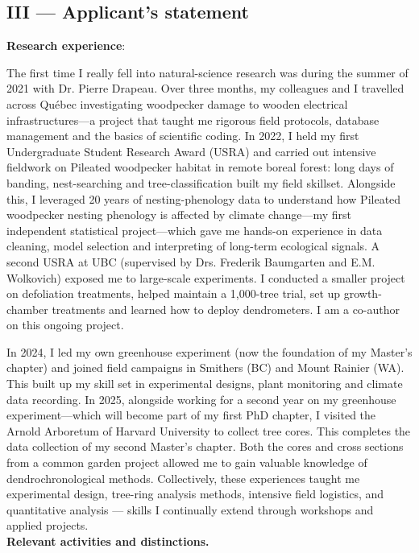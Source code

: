 \documentclass[12pt]{article}
\begin{document}
\subsection*{III --- Applicant’s statement}

\textbf{Research experience}: 

The first time I really fell into natural-science research was during the summer of 2021 with Dr. Pierre Drapeau. Over three months, my colleagues and I travelled across Québec investigating woodpecker damage to wooden electrical infrastructures---a project that taught me rigorous field protocols, database management and the basics of scientific coding.  In 2022, I held my first Undergraduate Student Research Award (USRA) and carried out intensive fieldwork on Pileated woodpecker habitat in remote boreal forest: long days of banding, nest-searching and tree-classification built my field skillset. Alongside this, I leveraged 20 years of nesting-phenology data to understand how Pileated woodpecker nesting phenology is affected by climate change---my first independent statistical project---which gave me hands-on experience in data cleaning, model selection and interpreting of long-term ecological signals. A second USRA at UBC (supervised by Drs. Frederik Baumgarten and E.M. Wolkovich) exposed me to large-scale experiments. I conducted a smaller project on defoliation treatments, helped maintain a 1,000-tree trial, set up growth-chamber treatments and learned how to deploy dendrometers. I am a co-author on this ongoing project.

In 2024, I led my own greenhouse experiment (now the foundation of my Master’s chapter) and joined field campaigns in Smithers (BC) and Mount Rainier (WA). This built up my skill set in experimental designs, plant monitoring and climate data recording. In 2025, alongside working for a second year on my greenhouse experiment---which will become part of my first PhD chapter, I visited the Arnold Arboretum of Harvard University to collect tree cores. This completes the data collection of my second Master's chapter. Both the cores and cross sections from a common garden project allowed me to gain valuable knowledge of dendrochronological methods. Collectively, these experiences taught me experimental design, tree-ring analysis methods, intensive field logistics, and quantitative analysis — skills I continually extend through workshops and applied projects. \\

\textbf{Relevant activities and distinctions.}  
\end{document}
